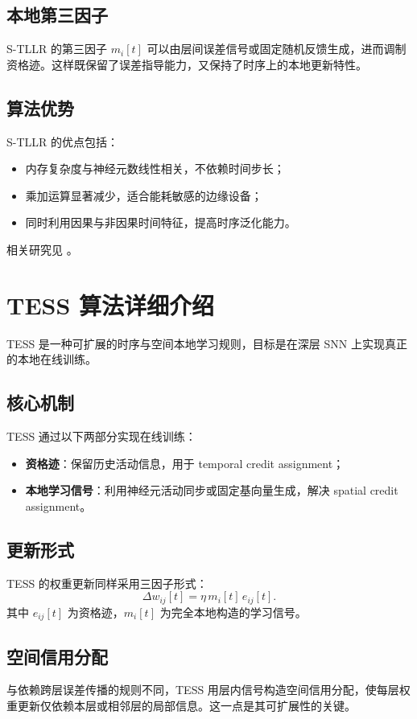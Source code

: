 \documentclass[journal,12pt,onecolumn]{IEEEtran}
\begin{document}
\subsection{本地第三因子}
S-TLLR 的第三因子 $m_i[t]$ 可以由层间误差信号或固定随机反馈生成，进而调制资格迹。这样既保留了误差指导能力，又保持了时序上的本地更新特性。

\subsection{算法优势}
S-TLLR 的优点包括：
\begin{itemize}
  \item 内存复杂度与神经元数线性相关，不依赖时间步长；
  \item 乘加运算显著减少，适合能耗敏感的边缘设备；
  \item 同时利用因果与非因果时间特征，提高时序泛化能力。
\end{itemize}

相关研究见 \cite{apolinario_s-tllr_2024}。

\section{TESS 算法详细介绍}
TESS 是一种可扩展的时序与空间本地学习规则，目标是在深层 SNN 上实现真正的本地在线训练。

\subsection{核心机制}
TESS 通过以下两部分实现在线训练：
\begin{itemize}
  \item \textbf{资格迹}：保留历史活动信息，用于 temporal credit assignment；
  \item \textbf{本地学习信号}：利用神经元活动同步或固定基向量生成，解决 spatial credit assignment。
\end{itemize}

\subsection{更新形式}
TESS 的权重更新同样采用三因子形式：
\begin{equation}
  \Delta w_{ij}[t] = \eta \, m_i[t] \, e_{ij}[t].
\end{equation}
其中 $e_{ij}[t]$ 为资格迹，$m_i[t]$ 为完全本地构造的学习信号。

\subsection{空间信用分配}
与依赖跨层误差传播的规则不同，TESS 用层内信号构造空间信用分配，使每层权重更新仅依赖本层或相邻层的局部信息。这一点是其可扩展性的关键。
\end{document}
